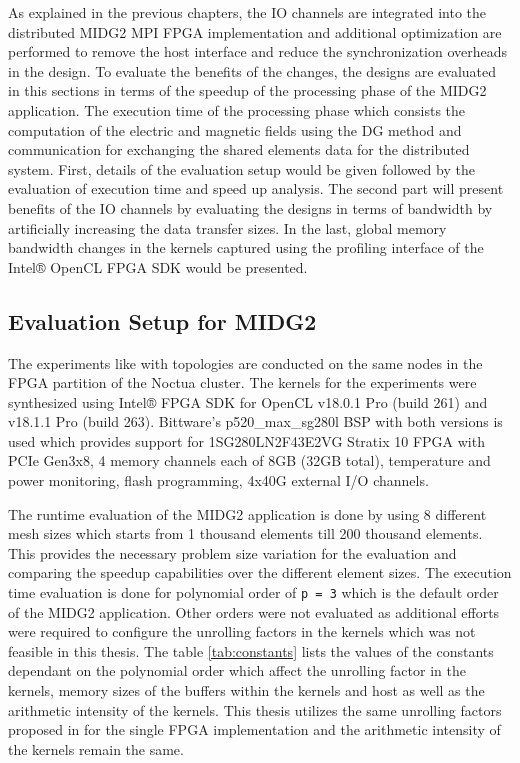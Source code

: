 As explained in the previous chapters, the IO channels are integrated into the
distributed MIDG2 MPI FPGA implementation and additional optimization are performed
to remove the host interface and reduce the synchronization overheads in the design.
To evaluate the benefits of the changes, the designs are evaluated in this sections
in terms of the speedup of the processing phase of the MIDG2 application. The execution
time of the processing phase which consists the computation of the electric
and magnetic fields using the \ac{DG} method and communication for exchanging the
shared elements data for the distributed system. First, details of the
evaluation setup would be given followed by the evaluation of execution
time and speed up analysis. The second part will present benefits of the IO
channels by evaluating the designs in terms of bandwidth by artificially
increasing the data transfer sizes. In the last, global memory bandwidth
changes in the kernels captured using the profiling interface of the Intel®
OpenCL FPGA SDK would be presented.

\subsection{Evaluation Setup for MIDG2}

The experiments like with topologies are conducted on the same
nodes in the FPGA partition of the Noctua cluster. The kernels
for the experiments were synthesized using Intel® FPGA SDK for OpenCL
v18.0.1 Pro (build 261) and v18.1.1 Pro (build 263). Bittware's
p520\_max\_sg280l BSP with both versions is used which provides support
for 1SG280LN2F43E2VG Stratix 10 FPGA with PCIe Gen3x8, 4 memory channels
each of 8GB (32GB total), temperature and power monitoring,
flash programming, 4x40G external I/O channels.

The runtime evaluation of the MIDG2 application is done by using
8 different mesh sizes which starts from 1 thousand elements till
200 thousand elements. This provides the necessary problem size
variation for the evaluation and comparing the speedup capabilities
over the different element sizes. The execution time evaluation
is done for polynomial order of \texttt{p = 3} which is the default
order of the MIDG2 application. Other orders were not evaluated as
additional efforts were required to configure the unrolling factors
in the kernels which was not feasible in this thesis. The table
\ref{tab:constants} lists the values of the constants dependant
on the polynomial order which affect the unrolling factor in the
kernels, memory sizes of the buffers within the kernels and
host as well as the arithmetic intensity of the kernels.
This thesis utilizes the same unrolling factors proposed in
\cite{kenter_opencl-based_2018} for the single FPGA implementation
and the arithmetic intensity of the kernels remain the same.

